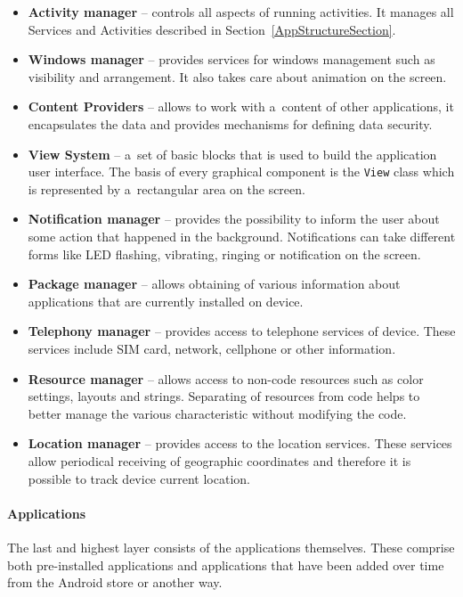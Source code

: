 \begin{itemize}
    \item \textbf{Activity manager} -- controls all aspects of running activities. It manages all Services and
    Activities described in Section~\ref{AppStructureSection}.
    \item \textbf{Windows manager} -- provides services for windows management such as visibility and arrangement. It
    also takes care about animation on the screen.
    \item \textbf{Content Providers} -- allows to work with a~content of other applications, it encapsulates the data
    and provides mechanisms for defining data security.
    \item \textbf{View System} -- a~set of basic blocks that is used to build the application user interface. The basis
    of every graphical component is the \texttt{View} class which is represented by a~rectangular area on the screen.
    \item \textbf{Notification manager} -- provides the possibility to inform the user about some action that happened
    in the background. Notifications can take different forms like LED flashing, vibrating, ringing or notification on
    the screen.
    \item \textbf{Package manager} -- allows obtaining of various information about applications that are currently
    installed on device.
    \item \textbf{Telephony manager} -- provides access to telephone services of device. These services include SIM
    card, network, cellphone or other information.
    \item \textbf{Resource manager} -- allows access to non-code resources such as color settings, layouts and strings.
    Separating of resources from code helps to better manage the various characteristic without modifying the code.
    \item \textbf{Location manager} -- provides access to the location services. These services allow periodical
    receiving of geographic coordinates and therefore it is possible to track device current location.
\end{itemize}

\paragraph{Applications}
The last and highest layer consists of the applications themselves. These comprise both pre-installed applications and
applications that have been added over time from the Android store or another way.

